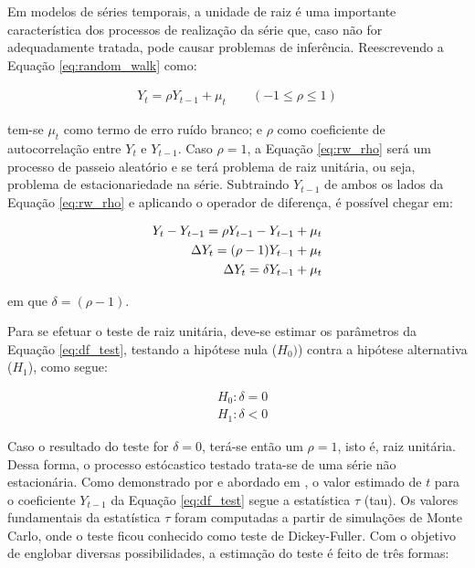 
Em modelos de séries temporais, a unidade de raiz é uma importante característica dos processos de realização da série que, caso não for adequadamente tratada, pode causar problemas de inferência. Reescrevendo a Equação \eqref{eq:random_walk} como:

\begin{ceqn}
\begin{align} \label{eq:rw_rho}
 Y_{t} = \rho Y_{t-1} + \mu_{t} \qquad (-1 \leq \rho \leq 1)
\end{align}
\end{ceqn} tem-se $\mu_{t}$ como termo de erro ruído branco; e $\rho$ como coeficiente de autocorrelação entre $Y_{t}$ e $Y_{t-1}$. Caso $\rho = 1$, a Equação \eqref{eq:rw_rho} será um processo de passeio aleatório e se terá problema de raiz unitária, ou seja, problema de estacionariedade na série. Subtraindo $Y_{t-1}$ de ambos os lados da Equação \eqref{eq:rw_rho} e aplicando o operador de diferença, é possível chegar em:

\begin{ceqn}
\begin{align} \label{eq:df_test}
Y_{t} - Y_{t-1} = \rho Y_{t-1} - Y_{t-1} + \mu_{t} \notag \\
\Delta Y_{t} = (\rho - 1) Y_{t-1} + \mu_{t} \notag \\
\Delta Y_{t} = \delta Y_{t-1} + \mu_{t}
\end{align}
\end{ceqn} em que $\delta = (\rho - 1)$.

Para se efetuar o teste de raiz unitária, deve-se estimar os parâmetros da Equação \eqref{eq:df_test}, testando a hipótese nula ($H_{0})$) contra a hipótese alternativa ($H_{1}$), como segue:

\begin{ceqn}
\begin{align} \label{eq:hipoteses_estacionariedade}
&H_{0}: \delta = 0 \\ %
&H_{1}: \delta < 0 %
\end{align}
\end{ceqn}

Caso o resultado do teste for $\delta = 0$, terá-se então um $\rho = 1$, isto é, raiz unitária. Dessa forma, o processo estócastico testado trata-se de uma série não estacionária. Como demonstrado por  e abordado em , o valor estimado de $t$ para o coeficiente $Y_{t-1}$ da Equação \eqref{eq:df_test} segue a estatística $\tau$ (tau). Os valores fundamentais da estatística $\tau$ foram computadas a partir de simulações de Monte Carlo, onde o teste ficou conhecido como teste de Dickey-Fuller. Com o objetivo de englobar diversas possibilidades, a estimação do teste é feito de três formas:

